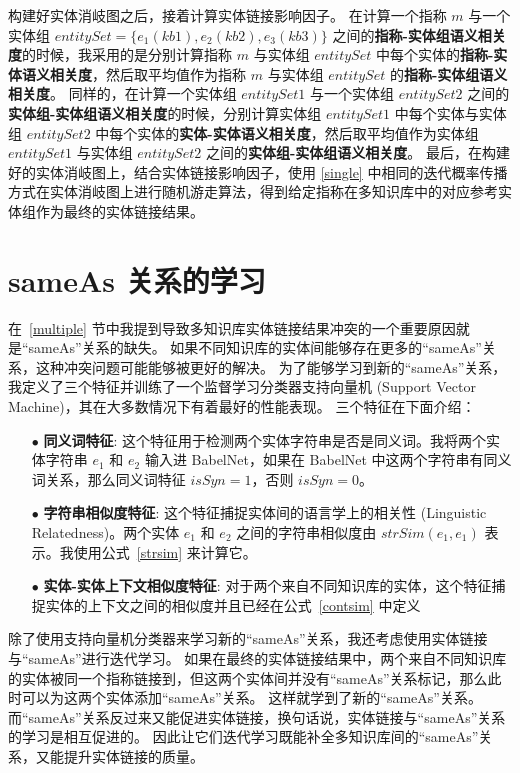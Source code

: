 构建好实体消岐图之后，接着计算实体链接影响因子。
在计算一个指称 $m$ 与一个实体组 $entitySet=\{e_1 (kb1), e_2 (kb2), e_3 (kb3)\}$ 之间的\textbf{指称-实体组语义相关度}的时候，我采用的是分别计算指称 $m$ 与实体组 $entitySet$ 中每个实体的\textbf{指称-实体语义相关度}，然后取平均值作为指称 $m$ 与实体组 $entitySet$ 的\textbf{指称-实体组语义相关度}。
同样的，在计算一个实体组 $entitySet1$ 与一个实体组 $entitySet2$ 之间的\textbf{实体组-实体组语义相关度}的时候，分别计算实体组 $entitySet1$ 中每个实体与实体组 $entitySet2$ 中每个实体的\textbf{实体-实体语义相关度}，然后取平均值作为实体组 $entitySet1$ 与实体组 $entitySet2$ 之间的\textbf{实体组-实体组语义相关度}。
最后，在构建好的实体消岐图上，结合实体链接影响因子，使用 \ref{single} 中相同的迭代概率传播方式在实体消岐图上进行随机游走算法，得到给定指称在多知识库中的对应参考实体组作为最终的实体链接结果。


\section{sameAs 关系的学习}
在~\ref{multiple} 节中我提到导致多知识库实体链接结果冲突的一个重要原因就是``sameAs''关系的缺失。
如果不同知识库的实体间能够存在更多的``sameAs''关系，这种冲突问题可能能够被更好的解决。
为了能够学习到新的``sameAs''关系，我定义了三个特征并训练了一个监督学习分类器支持向量机\cite{tong2001support} (Support Vector Machine)，其在大多数情况下\cite{fernandez2014we}有着最好的性能表现。
三个特征在下面介绍：
\begin{itemize}
  \item[$\bullet$] \textbf{同义词特征}: 这个特征用于检测两个实体字符串是否是同义词。我将两个实体字符串 $e_1$ 和 $e_2$ 输入进 BabelNet\cite{navigli2010babelnet}，如果在 BabelNet 中这两个字符串有同义词关系，那么同义词特征 $isSyn = 1$，否则 $isSyn = 0$。
  \item[$\bullet$] \textbf{字符串相似度特征}: 这个特征捕捉实体间的语言学上的相关性 (Linguistic Relatedness)。两个实体 $e_1$ 和 $e_2$ 之间的字符串相似度由 $strSim(e_1, e_1)$ 表示。我使用公式~\ref{strsim} 来计算它。
  \item[$\bullet$] \textbf{实体-实体上下文相似度特征}: 对于两个来自不同知识库的实体，这个特征捕捉实体的上下文之间的相似度并且已经在公式~\ref{contsim} 中定义
\end{itemize}
除了使用支持向量机分类器来学习新的``sameAs''关系，我还考虑使用实体链接与``sameAs''进行迭代学习。
如果在最终的实体链接结果中，两个来自不同知识库的实体被同一个指称链接到，但这两个实体间并没有``sameAs''关系标记，那么此时可以为这两个实体添加``sameAs''关系。
这样就学到了新的``sameAs''关系。
而``sameAs''关系反过来又能促进实体链接，换句话说，实体链接与``sameAs''关系的学习是相互促进的。
因此让它们迭代学习既能补全多知识库间的``sameAs''关系，又能提升实体链接的质量。


